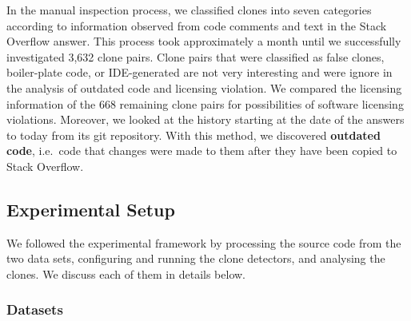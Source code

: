 \documentclass[sigconf,review, anonymous]{acmart}
\begin{document}
In the manual inspection process, we classified clones into seven
categories according to information observed from code comments and
text in the Stack Overflow answer. This process took approximately a
month until we successfully investigated 3,632 clone pairs. Clone
pairs that were classified as false clones, boiler-plate code, or
IDE-generated are not very interesting and were ignore in the analysis
of outdated code and licensing violation. We compared the licensing
information of the 668 remaining clone pairs for possibilities of software
licensing violations. Moreover, we looked at the history starting at
the date of the answers to today from its git repository. With this
method, we discovered \textbf{outdated code}, i.e.~code that changes
were made to them after they have been copied to Stack
Overflow. %

\subsection{Experimental Setup}

We followed the experimental framework by processing the source code from the two data sets, configuring and running the clone detectors, and analysing the clones. We discuss each of them in details below. 

\subsubsection{Datasets}
\end{document}

